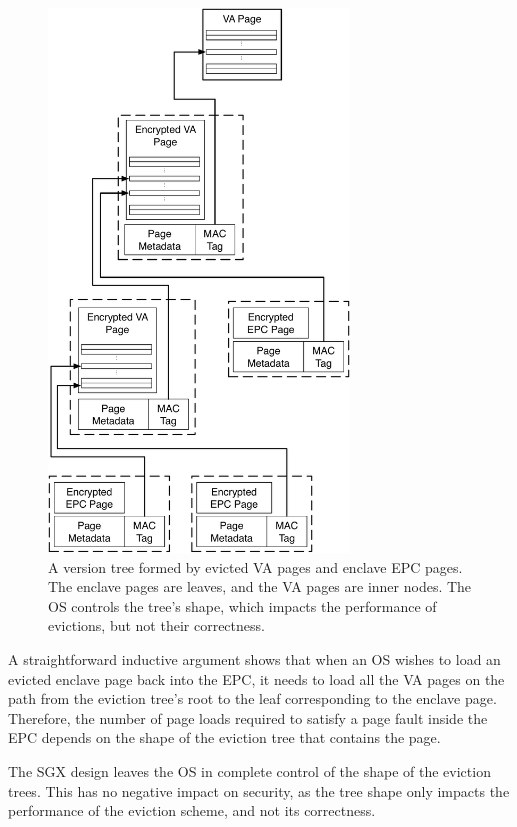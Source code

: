 \begin{figure}[hbt!]
  \centering
  \includegraphics[width=80mm]{figures/sgx_eviction_tree.pdf}
  \caption{
    A version tree formed by evicted VA pages and enclave EPC pages. The
    enclave pages are leaves, and the VA pages are inner nodes. The OS controls
    the tree's shape, which impacts the performance of evictions, but not their
    correctness.
  }
  \label{fig:sgx_eviction_tree}
\end{figure}

A straightforward inductive argument shows that when an OS wishes to load an
evicted enclave page back into the EPC, it needs to load all the VA pages on
the path from the eviction tree's root to the leaf corresponding to the enclave
page. Therefore, the number of page loads required to satisfy a page fault
inside the EPC depends on the shape of the eviction tree that contains the
page.

The SGX design leaves the OS in complete control of the shape of the eviction
trees. This has no negative impact on security, as the tree shape only impacts
the performance of the eviction scheme, and not its correctness.
